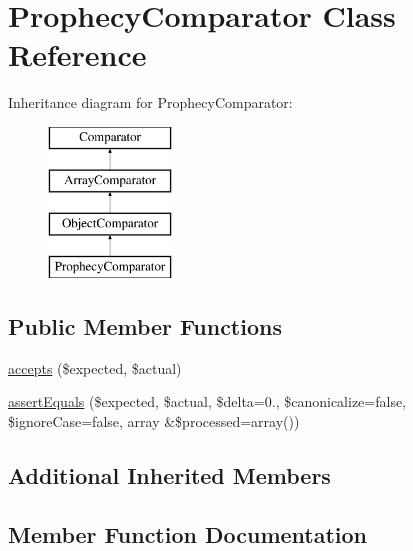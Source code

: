 \hypertarget{class_prophecy_1_1_comparator_1_1_prophecy_comparator}{}\section{Prophecy\+Comparator Class Reference}
\label{class_prophecy_1_1_comparator_1_1_prophecy_comparator}
Inheritance diagram for Prophecy\+Comparator\+:\begin{figure}[H]
\begin{center}
\leavevmode
\includegraphics[height=4.000000cm]{class_prophecy_1_1_comparator_1_1_prophecy_comparator}
\end{center}
\end{figure}
\subsection*{Public Member Functions}
\begin{DoxyCompactItemize}
\item 
\mbox{\hyperlink{class_prophecy_1_1_comparator_1_1_prophecy_comparator_ae9bdf0cba02ce3470169280656cdeb84}{accepts}} (\$expected, \$actual)
\item 
\mbox{\hyperlink{class_prophecy_1_1_comparator_1_1_prophecy_comparator_a85a7369896910cf1d55e31d477c29f1e}{assert\+Equals}} (\$expected, \$actual, \$delta=0., \$canonicalize=false, \$ignore\+Case=false, array \&\$processed=array())
\end{DoxyCompactItemize}
\subsection*{Additional Inherited Members}


\subsection{Member Function Documentation}
\mbox{\label{class_prophecy_1_1_comparator_1_1_prophecy_comparator_ae9bdf0cba02ce3470169280656cdeb84}} 
